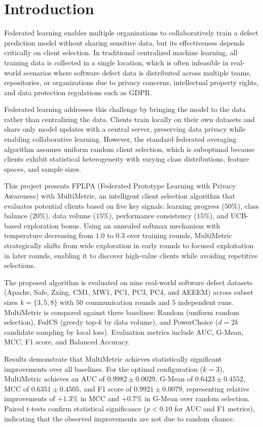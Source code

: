 \chapter{Introduction}

Federated learning enables multiple organizations to collaboratively train a defect prediction model without sharing sensitive data, but its effectiveness depends critically on client selection. In traditional centralized machine learning, all training data is collected in a single location, which is often infeasible in real-world scenarios where software defect data is distributed across multiple teams, repositories, or organizations due to privacy concerns, intellectual property rights, and data protection regulations such as GDPR.

Federated learning addresses this challenge by bringing the model to the data rather than centralizing the data. Clients train locally on their own datasets and share only model updates with a central server, preserving data privacy while enabling collaborative learning. However, the standard federated averaging algorithm assumes uniform random client selection, which is suboptimal because clients exhibit statistical heterogeneity with varying class distributions, feature spaces, and sample sizes.

This project presents FPLPA (Federated Prototype Learning with Privacy Awareness) with MultiMetric, an intelligent client selection algorithm that evaluates potential clients based on five key signals: learning progress ($50\%$), class balance ($20\%$), data volume ($15\%$), performance consistency ($15\%$), and UCB-based exploration bonus. Using an annealed softmax mechanism with temperature decreasing from $1.0$ to $0.3$ over training rounds, MultiMetric strategically shifts from wide exploration in early rounds to focused exploitation in later rounds, enabling it to discover high-value clients while avoiding repetitive selections.

The proposed algorithm is evaluated on nine real-world software defect datasets (Apache, Safe, Zxing, CM1, MW1, PC1, PC3, PC4, and AEEEM) across subset sizes $k = \{3, 5, 8\}$ with $50$ communication rounds and $5$ independent runs. MultiMetric is compared against three baselines: Random (uniform random selection), FedCS (greedy top-$k$ by data volume), and PowerChoice ($d=2k$ candidate sampling by local loss). Evaluation metrics include AUC, G-Mean, MCC, F1 score, and Balanced Accuracy.

Results demonstrate that MultiMetric achieves statistically significant improvements over all baselines. For the optimal configuration ($k=3$), MultiMetric achieves an AUC of $0.9982 \pm 0.0029$, G-Mean of $0.6423 \pm 0.4552$, MCC of $0.6351 \pm 0.4505$, and F1 score of $0.9921 \pm 0.0079$, representing relative improvements of $+1.3\%$ in MCC and $+0.7\%$ in G-Mean over random selection. Paired t-tests confirm statistical significance ($p < 0.10$ for AUC and F1 metrics), indicating that the observed improvements are not due to random chance.


